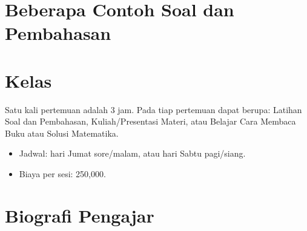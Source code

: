 \documentclass{article}
\begin{document}
\section{Beberapa Contoh Soal dan Pembahasan}


\section{Kelas}

Satu kali pertemuan adalah 3 jam. Pada tiap pertemuan dapat berupa: Latihan Soal dan Pembahasan, Kuliah/Presentasi Materi, atau Belajar Cara Membaca Buku atau Solusi Matematika.

\begin{itemize}

\item Jadwal: hari Jumat sore/malam, atau hari Sabtu pagi/siang. 
\item Biaya per sesi: 250,000.

\end{itemize}

\section{Biografi Pengajar}
\end{document}
